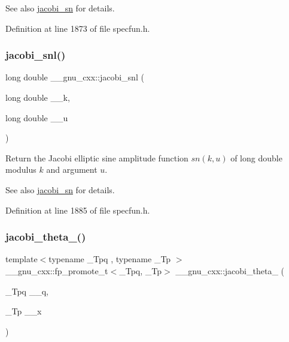 \begin{DoxySeeAlso}{See also}
\hyperlink{group__gnu__math__spec__func_ga49d5e18152dd0dd0f496b8c8582e7045}{jacobi\+\_\+sn} for details. 
\end{DoxySeeAlso}


Definition at line 1873 of file specfun.\+h.

\mbox{\label{group__gnu__math__spec__func_ga1c13539e3b051a07b1c28aa8a0aeb1b4}} 
\subsubsection{\texorpdfstring{jacobi\+\_\+snl()}{jacobi\_snl()}}
{\footnotesize\ttfamily long double \+\_\+\+\_\+gnu\+\_\+cxx\+::jacobi\+\_\+snl (\begin{DoxyParamCaption}\item[{long double}]{\+\_\+\+\_\+k,  }\item[{long double}]{\+\_\+\+\_\+u }\end{DoxyParamCaption})\hspace{0.3cm}{\ttfamily [inline]}}

Return the Jacobi elliptic sine amplitude function $ sn(k,u) $ of {\ttfamily long double} modulus $ k $ and argument $ u $.

\begin{DoxySeeAlso}{See also}
\hyperlink{group__gnu__math__spec__func_ga49d5e18152dd0dd0f496b8c8582e7045}{jacobi\+\_\+sn} for details. 
\end{DoxySeeAlso}


Definition at line 1885 of file specfun.\+h.

\mbox{\label{group__gnu__math__spec__func_ga996ca8c1fff75e2d4f196e99e0919933}} 
\subsubsection{\texorpdfstring{jacobi\+\_\+theta\+\_()}{jacobi\_theta\_1()}}
{\footnotesize\ttfamily template$<$typename \+\_\+\+Tpq , typename \+\_\+\+Tp $>$ \\
\+\_\+\+\_\+gnu\+\_\+cxx\+::fp\+\_\+promote\+\_\+t$<$\+\_\+\+Tpq, \+\_\+\+Tp$>$ \+\_\+\+\_\+gnu\+\_\+cxx\+::jacobi\+\_\+theta\+\_ (\begin{DoxyParamCaption}\item[{\+\_\+\+Tpq}]{\+\_\+\+\_\+q,  }\item[{\+\_\+\+Tp}]{\+\_\+\+\_\+x }\end{DoxyParamCaption})\hspace{0.3cm}{\ttfamily [inline]}}

